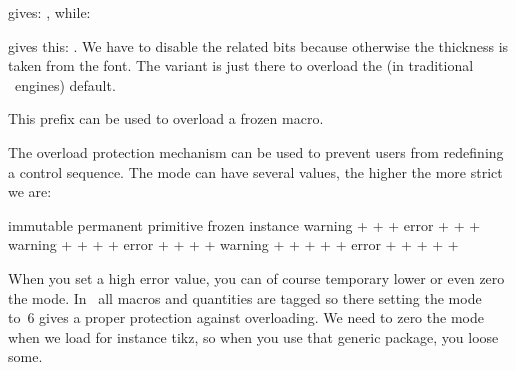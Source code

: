 \typebuffer[demo]

gives: , while:

\startbuffer[setup]
\mathfontcontrol\zerocount
\Umathoverbarkern{}
\Umathoverbarvgap{}
\Umathoverbarrule{}
\Umathoverlinevariant\textstyle\scriptstyle
\stopbuffer

\typebuffer[setup]

gives this: . We have to disable the related
 bits because otherwise the thickness is taken from the font. The
variant is just there to overload the (in traditional \TEX\ engines) default.

\stopoldprimitive

\startnewprimitive[title={\prm {overloaded}}]

This prefix can be used to overload a frozen macro.

\stopnewprimitive

\startnewprimitive[title={\prm {overloadmode}}]

The overload protection mechanism can be used to prevent users from redefining
a control sequence. The mode can have several values, the higher the more strict
we are:

\starttabulate[||||||||]
    \NC   \NC         \NC immutable \NC permanent \NC primitive \NC frozen \NC instance \NC \NR
     \NC warning \NC +         \NC +         \NC +         \NC        \NC          \NC \NR
     \NC error   \NC +         \NC +         \NC +         \NC        \NC          \NC \NR
     \NC warning \NC +         \NC +         \NC +         \NC +      \NC          \NC \NR
     \NC error   \NC +         \NC +         \NC +         \NC +      \NC          \NC \NR
     \NC warning \NC +         \NC +         \NC +         \NC +      \NC +        \NC \NR
     \NC error   \NC +         \NC +         \NC +         \NC +      \NC +        \NC \NR
\stoptabulate

When you set a high error value, you can of course temporary lower or even zero
the mode. In \CONTEXT\ all macros and quantities are tagged so there setting the
mode to~6 gives a proper protection against overloading. We need to zero the mode
when we load for instance tikz, so when you use that generic package, you loose
some.

\stopnewprimitive

\startnewprimitive[title={\prm {overshoot}}]


